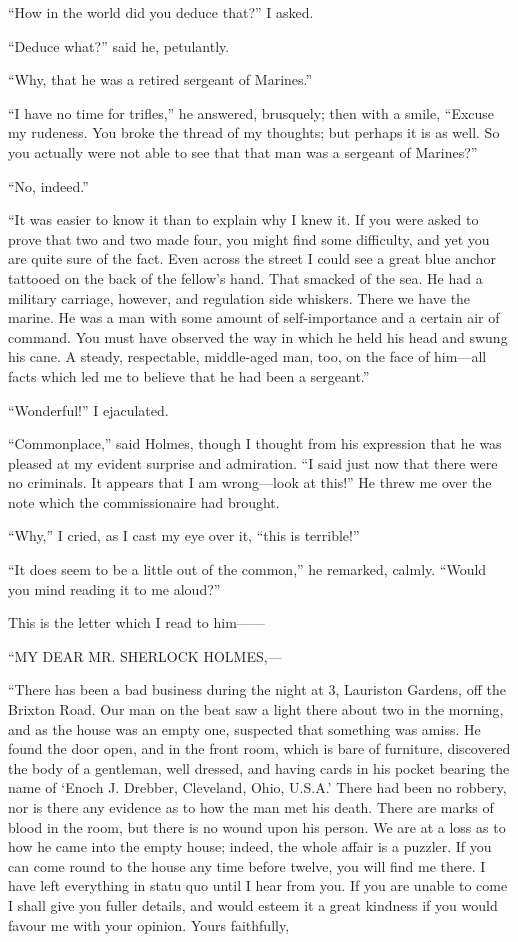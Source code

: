 \documentclass[12pt]{book}
\begin{document}
“How in the world did you deduce that?” I asked. 

“Deduce what?” said he, petulantly. 

“Why, that he was a retired sergeant of Marines.” 

“I have no time for trifles,” he answered, brusquely; then with a smile, “Excuse my rudeness. You broke the thread of my thoughts; but perhaps it is as well. So you actually were not able to see that that man was a sergeant of Marines?” 

“No, indeed.” 

“It was easier to know it than to explain why I knew it. If you were asked to prove that two and two made four, you might find some difficulty, and yet you are quite sure of the fact. Even across the street I could see a great blue anchor tattooed on the back of the fellow’s hand. That smacked of the sea. He had a military carriage, however, and regulation side whiskers. There we have the marine. He was a man with some amount of self-importance and a certain air of command. You must have observed the way in which he held his head and swung his cane. A steady, respectable, middle-aged man, too, on the face of him—all facts which led me to believe that he had been a sergeant.” 

“Wonderful!” I ejaculated. 

“Commonplace,” said Holmes, though I thought from his expression that he was pleased at my evident surprise and admiration. “I said just now that there were no criminals. It appears that I am wrong—look at this!” He threw me over the note which the commissionaire had brought.

“Why,” I cried, as I cast my eye over it, “this is terrible!” 

“It does seem to be a little out of the common,” he remarked, calmly. “Would you mind reading it to me aloud?” 

This is the letter which I read to him—— 

“MY DEAR MR. SHERLOCK HOLMES,— 

“There has been a bad business during the night at 3, Lauriston Gardens, off the Brixton Road. Our man on the beat saw a light there about two in the morning, and as the house was an empty one, suspected that something was amiss. He found the door open, and in the front room, which is bare of furniture, discovered the body of a gentleman, well dressed, and having cards in his pocket bearing the name of ‘Enoch J. Drebber, Cleveland, Ohio, U.S.A.’ There had been no robbery, nor is there any evidence as to how the man met his death. There are marks of blood in the room, but there is no wound upon his person. We are at a loss as to how he came into the empty house; indeed, the whole affair is a puzzler. If you can come round to the house any time before twelve, you will find me there. I have left everything in statu quo until I hear from you. If you are unable to come I shall give you fuller details, and would esteem it a great kindness if you would favour me with your opinion. Yours faithfully, 
\end{document}
